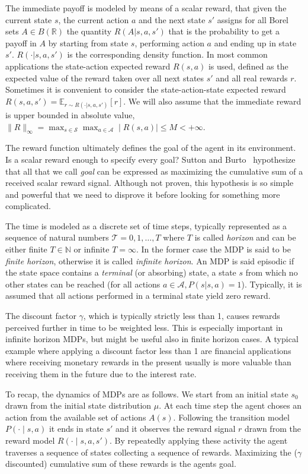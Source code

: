 The immediate payoff is modeled by means of a scalar reward, that given the current state $s$, the current action $a$ and the next state $s′$ assigns for all Borel sets $A \in B(\mathbb{R})$ the quantity $R(A|s, a, s′)$ that is the probability to get a payoff in $A$ by starting from state $s$, performing action $a$ and ending up in state $s′$. $R(\cdot|s, a, s′)$ is the corresponding density function. In most common applications the state-action expected reward $R(s, a)$ is used,  defined as the expected value of the reward taken over all next states $s′$ and all real rewards $r$. Sometimes it is convenient to consider the state-action-state expected reward $R(s, a, s′) = \mathbb{E}_{r∼R(\cdot|s,a,s′)} [r]$. We will also assume that the immediate reward is upper bounded in absolute value, \ie $\parallel R\parallel_{\infty} = \max_{s\in \mathcal{S}} \max_{a \in \mathcal{A}} \mid R(s,a)\mid \leq M < +\infty $.\par
The reward function ultimately defines the goal of the agent in its environment. Is a scalar reward enough to specify every goal? Sutton and Burto~\cite{Sutton:1998:IRL:551283} hypothesize that all that we call \emph{goal} can be expressed as maximizing the cumulative sum of a received scalar reward signal. Although not proven, this hypothesis is so simple and powerful that we need to disprove it before looking for something more complicated.\par
The time is modeled as a discrete set of time steps, typically represented as a sequence of natural numbers $\mathcal{T} = {0, 1, \ldots, T }$ where $T$ is called \emph{horizon} and can be either finite $T \in \mathbb{N}$ or infinite $T = \infty$. In the former case the MDP is said to be \emph{finite horizon}, otherwise it is called \emph{infinite horizon}. An MDP is said episodic if the state space contains a \emph{terminal} (or absorbing) state, \ie a state $s$ from which no other states can be reached (for all actions $a \in \mathcal{A}, P(s|s,a)= 1$). Typically, it is assumed that all actions performed in a terminal state yield zero reward.\par
The discount factor $\gamma$, which is typically strictly less than 1, causes rewards perceived further in time to be weighted less. This is especially important in infinite horizon MDPs, but might be useful also in finite horizon cases. A typical example where applying a discount factor less than 1 are financial applications where receiving monetary rewards in the present usually is more valuable than receiving them in the future due to the interest rate.\par
To recap, the dynamics of MDPs are as follows. We start from an initial state $s_{0}$ drawn from the initial state distribution $\mu$. At each time step the agent choses an action from the available set of actions $A(s)$. Following the transition model $P(\cdot \mid s,a)$ it ends in state $s'$ and it observes the reward signal $r$ drawn from the reward model $R(\cdot \mid s,a,s')$. By repeatedly applying these activity the agent traverses a sequence of states collecting a sequence of rewards. Maximizing the ($\gamma$ discounted) cumulative sum of these rewards is the agents goal.

